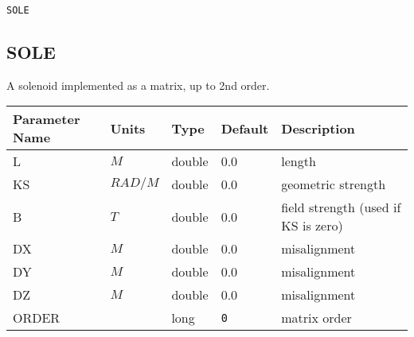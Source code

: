\begin{latexonly}
\newpage
\begin{center}{\Large\verb|SOLE|}\end{center}
\end{latexonly}\subsection{SOLE}
A solenoid implemented as a matrix, up to 2nd order.
\\
\begin{tabular}{|l|l|l|l|p{\descwidth}|} \hline
Parameter Name & Units & Type & Default & Description \\ \hline 
L & $M$ & double &  0.0 & length  \\ \hline 
KS & $RAD/M$ & double &  0.0 & geometric strength  \\ \hline 
B & $T$ & double &  0.0 & field strength (used if KS is zero)  \\ \hline 
DX & $M$ & double &  0.0 & misalignment  \\ \hline 
DY & $M$ & double &  0.0 & misalignment  \\ \hline 
DZ & $M$ & double &  0.0 & misalignment  \\ \hline 
ORDER &  & long &  \verb|0| & matrix order  \\ \hline 
\end{tabular}

